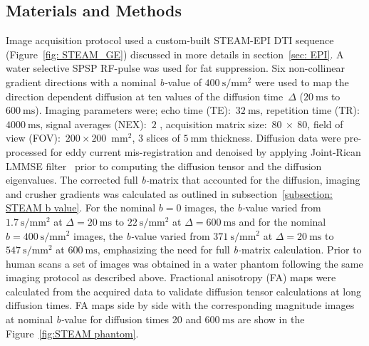 \subsection{Materials and Methods}
Image acquisition protocol used a custom-built STEAM-EPI DTI sequence (Figure~\ref{fig: STEAM_GE}) discussed in more details in section~\ref{sec: EPI}. 
A water selective SPSP RF-pulse was used for fat suppression. 
Six non-collinear gradient directions with a nominal \mbox{\textit{b-}value} of $\SI{400}{\second \per\milli\meter^2}$ were used to map the direction dependent diffusion at ten values of the diffusion time~$\Delta$ ($\SI{20}{\milli\second}$ to $\SI{600}{\milli\second}$). 
Imaging parameters were; echo time (TE):~$\SI{32}{\milli\second}$, repetition time (TR):~$\SI{4000}{\milli\second}$, signal averages (NEX):~$2$ , acquisition matrix size:~$80~\times~80$, field of view (FOV):~$200 \times 200 \; \SI{}{\milli\meter^2}$, 3 slices of $\SI{5}{\milli\meter}$ thickness. 
Diffusion data were pre-processed for eddy current mis-registration and denoised by applying Joint-Rican LMMSE filter~\cite{RND24} prior to computing the diffusion tensor and the diffusion eigenvalues. 
The corrected full \textit{b-}matrix that accounted for the diffusion, imaging and crusher gradients was calculated as outlined in subsection~\ref{subsection: STEAM b value}. For the nominal $b = 0$ images, the \mbox{\textit{b-}value} varied from $\SI{1.7}{\second \per  \milli\meter^2}$ at $\Delta = \SI{20}{\milli\second}$ to $\SI{22}{\second\per\milli\meter^2}$ at $\Delta = \SI{600}{\milli\second}$ and for the nominal $b = \SI{400}{\second\per\milli\meter^2}$ images, the \mbox{\textit{b-}value} varied from $\SI{371}{\second\per\milli\meter^2}$ at $\Delta = \SI{20}{\milli\second}$ to $\SI{547}{\second\per\milli\meter^2}$ at $\SI{600}{\milli\second}$, emphasizing the need for full \textit{b-}matrix calculation. 
Prior to human scans a set of images was obtained in a water phantom following the same imaging protocol as described above. 
Fractional anisotropy (FA) maps were calculated from the acquired data to validate diffusion tensor calculations at long diffusion times. 
FA maps side by side with the corresponding magnitude images at nominal \mbox{\textit{b-}value} for diffusion times 20 and $\SI{600}{\milli\second}$ are show in the Figure~\ref{fig:STEAM phantom}. 
